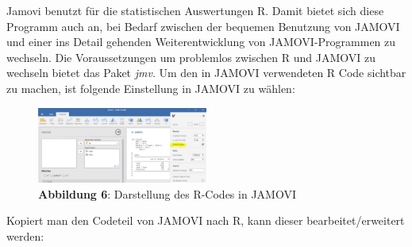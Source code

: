 \documentclass[]{article}
\begin{document}
Jamovi benutzt für die statistischen Auswertungen R. Damit bietet sich
diese Programm auch an, bei Bedarf zwischen der bequemen Benutzung von
JAMOVI und einer ins Detail gehenden Weiterentwicklung von
JAMOVI-Programmen zu wechseln. Die Voraussetzungen um problemlos
zwischen R und JAMOVI zu wechseln bietet das Paket \emph{jmv}. Um den in
JAMOVI verwendeten R Code sichtbar zu machen, ist folgende Einstellung
in JAMOVI zu wählen:

\begin{figure}
\centering
\includegraphics[width=0.50000\textwidth]{Images/01_JAMOVI_RSyntax.PNG}
\caption{\textbf{Abbildung 6}: Darstellung des R-Codes in JAMOVI}
\end{figure}

Kopiert man den Codeteil von JAMOVI nach R, kann dieser
bearbeitet/erweitert werden:
\end{document}
